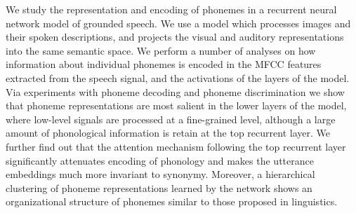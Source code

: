 We study the representation and encoding of phonemes in a recurrent neural network model of grounded speech. We use a model which processes images and their spoken descriptions, and projects the visual and auditory representations into the same semantic space. We perform a number of analyses on how information about individual phonemes is encoded in the MFCC features extracted from the speech signal, and the activations of the layers of the model. Via experiments with phoneme decoding and phoneme discrimination we show that phoneme representations are most salient in the lower layers of the model, where low-level signals are processed at a fine-grained level, although a large amount of phonological information is retain at the top recurrent layer. We further find out that the attention mechanism following the top recurrent layer significantly attenuates encoding of phonology and makes the utterance embeddings much more invariant to synonymy. Moreover, a hierarchical clustering of phoneme representations learned by the network shows an organizational structure of phonemes similar to those proposed in linguistics.
